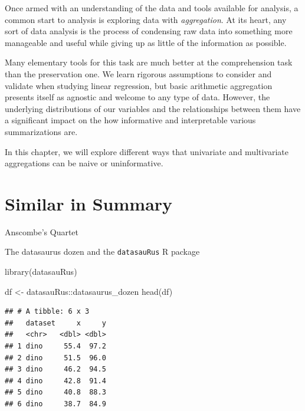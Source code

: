 \documentclass[
]{krantz}
\makeatletter
\newenvironment{Shaded}{\begin{snugshade}}{\end{snugshade}}
\newcommand{\FunctionTok}[1]{\textcolor[rgb]{0,0,0}{#1}}
\newcommand{\NormalTok}[1]{#1}
\newcommand{\OtherTok}[1]{\textcolor[rgb]{0.37,0.37,0.37}{#1}}
\newcommand{\SpecialCharTok}[1]{\textcolor[rgb]{0,0,0}{#1}}
\newenvironment{kframe}{%
\medskip{}
\setlength{\fboxsep}{.8em}
 \def\at@end@of@kframe{}%
 \ifinner\ifhmode%
  \def\at@end@of@kframe{\end{minipage}}%
  \begin{minipage}{\columnwidth}%
 \fi\fi%
 \def\FrameCommand##1{\hskip\@totalleftmargin \hskip-\fboxsep
 \colorbox{shadecolor}{##1}\hskip-\fboxsep
     \hskip-\linewidth \hskip-\@totalleftmargin \hskip\columnwidth}%
 \MakeFramed {\advance\hsize-\width
   \@totalleftmargin\z@ \linewidth\hsize
   \@setminipage}}%
 {\par\unskip\endMakeFramed%
 \at@end@of@kframe}
\renewenvironment{Shaded}{\begin{kframe}}{\end{kframe}}
\makeatother
\begin{document}
Once armed with an understanding of the data and tools available for analysis, a common start to analysis is exploring data with \emph{aggregation}.
At its heart, any sort of data analysis is the process of condensing raw data into something more manageable and useful while giving up as little of the information as possible.

Many elementary tools for this task are much better at the comprehension task than the preservation one.
We learn rigorous assumptions to consider and validate when studying linear regression, but basic arithmetic aggregation presents itself as agnostic and welcome to any type of data.
However, the underlying distributions of our variables and the relationships between them have a significant impact on the how informative and interpretable various summarizations are.

In this chapter, we will explore different ways that univariate and multivariate aggregations can be naive or uninformative.

\hypertarget{similar-in-summary}{%
\section{Similar in Summary}\label{similar-in-summary}}

Anscombe's Quartet

The datasaurus dozen \citep{datasaurus} and the \texttt{datasauRus} R package \citep{R-datasauRus}

\begin{Shaded}
\begin{Highlighting}[]
\FunctionTok{library}\NormalTok{(datasauRus)}
\end{Highlighting}
\end{Shaded}

\begin{Shaded}
\begin{Highlighting}[]
\NormalTok{df }\OtherTok{\textless{}{-}}\NormalTok{ datasauRus}\SpecialCharTok{::}\NormalTok{datasaurus\_dozen}
\FunctionTok{head}\NormalTok{(df)}
\end{Highlighting}
\end{Shaded}

\begin{verbatim}
## # A tibble: 6 x 3
##   dataset     x     y
##   <chr>   <dbl> <dbl>
## 1 dino     55.4  97.2
## 2 dino     51.5  96.0
## 3 dino     46.2  94.5
## 4 dino     42.8  91.4
## 5 dino     40.8  88.3
## 6 dino     38.7  84.9
\end{verbatim}
\end{document}
